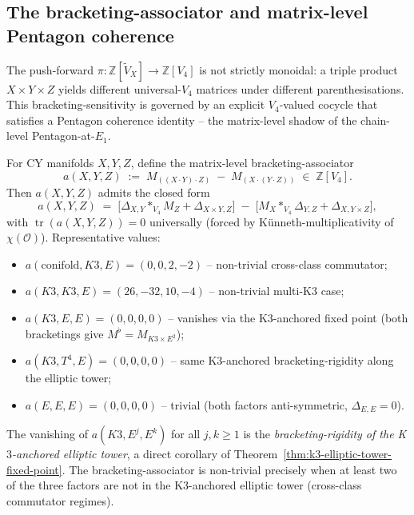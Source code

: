 \subsection{The bracketing-associator and matrix-level Pentagon coherence}
\label{subsec:bracketing-associator-pentagon}

The push-forward $\pi: \mathbb{Z}[\widetilde{V}_X] \to \mathbb{Z}[V_4]$
is not strictly monoidal: a triple product $X \times Y \times Z$
yields different universal-$V_4$ matrices under different
parenthesisations. This bracketing-sensitivity is governed by an
explicit $V_4$-valued cocycle that satisfies a Pentagon coherence
identity -- the matrix-level shadow of the chain-level Pentagon-at-$E_1$.

\begin{theorem}
\label{thm:bracketing-associator-closed-form}
For CY manifolds $X, Y, Z$, define the matrix-level
bracketing-associator
\[
 a(X, Y, Z)
 \;:=\; M_{((X \cdot Y) \cdot Z)} \;-\; M_{(X \cdot (Y \cdot Z))}
 \;\in\; \mathbb{Z}[V_4].
\]
Then $a(X, Y, Z)$ admits the closed form
\[
 \boxed{\;
 a(X, Y, Z)
 \;=\; \bigl[\Delta_{X, Y} *_{V_4} M_Z + \Delta_{X \times Y, Z}\bigr]
 \;-\; \bigl[M_X *_{V_4} \Delta_{Y, Z}
 + \Delta_{X, Y \times Z}\bigr],
 \;}
\]
with $\operatorname{tr}(a(X, Y, Z)) = 0$ universally
\textup{(}forced by Künneth-multiplicativity of $\chi(\mathcal{O})$\textup{).}
Representative values:
\begin{itemize}
\item $a(\mathrm{conifold}, K3, E) = (0, 0, 2, -2)$ -- non-trivial
 cross-class commutator;
\item $a(K3, K3, E) = (26, -32, 10, -4)$ -- non-trivial multi-K$3$
 case;
\item $a(K3, E, E) = (0, 0, 0, 0)$ -- vanishes via the K$3$-anchored
 fixed point
 \textup{(}both bracketings give
 $M^\flat = M_{K3 \times E^2}$\textup{);}
\item $a(K3, T^4, E) = (0, 0, 0, 0)$ -- same K$3$-anchored
 bracketing-rigidity along the elliptic tower;
\item $a(E, E, E) = (0, 0, 0, 0)$ -- trivial
 \textup{(}both factors anti-symmetric, $\Delta_{E, E} = 0$\textup{).}
\end{itemize}
The vanishing of $a(K3, E^j, E^k)$ for all $j, k \geq 1$ is the
\emph{bracketing-rigidity of the K$3$-anchored elliptic tower}, a
direct corollary of Theorem~\ref{thm:k3-elliptic-tower-fixed-point}.
The bracketing-associator is non-trivial precisely when at least
two of the three factors are not in the K$3$-anchored elliptic tower
\textup{(}cross-class commutator regimes\textup{).}
\end{theorem}

